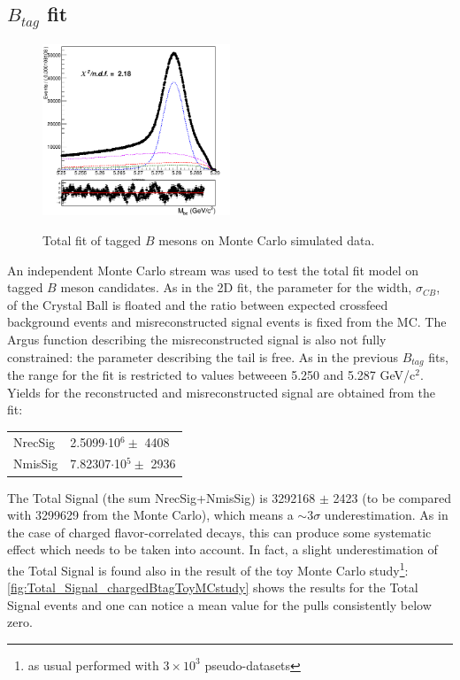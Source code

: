 \newpage
\subsection{ $B_{tag}$ fit}\label{sec:chargedAnticorrBtagFit}


\begin{figure}[h!]
\centering
{\includegraphics[width=0.50\textwidth]{06-chargedAnticorrBtoLambda/figs/stream1_chargedBtag_Total_fit_sigmaCB_misRecoSlope_free_370bins.png}}
\caption{Total fit of tagged $B$ mesons on Monte Carlo simulated data.}
\label{fig:chargedAnticorrLambdaC_BtagFit}
\end{figure}
\vspace{1.5cm} 

An independent Monte Carlo stream was used to test the total fit model on tagged $B$ meson candidates.
As in the 2D fit, the parameter for the width, $\sigma_{CB}$, of the Crystal Ball is floated and the ratio between expected crossfeed background events and  misreconstructed signal events is fixed from the MC. 
The Argus function describing the misreconstructed signal is also not fully constrained: the parameter describing the tail is free.
As in the previous $B_{tag}$ fits, the range for the fit is restricted to values betweeen 5.250 and 5.287 GeV/c$^2$.
Yields for the reconstructed and misreconstructed signal are obtained from the fit:\\
\vspace{0.25 cm}

\begin{tabular}{ |p{2.5cm}||p{4.2cm}|  }
 \hline
 NrecSig  & 2.5099$\cdot$10$^6 \pm$ 4408\\
 NmisSig &  7.82307$\cdot$10$^5 \pm$ 2936 \\
 \hline
\end{tabular}


\vspace{0.5 cm}
\noindent The Total Signal (the sum  NrecSig+NmisSig) is 3292168 $\pm$ 2423 (to be compared with 3299629 from the Monte Carlo), which means a $\sim 3\sigma$ underestimation. As in the case of charged flavor-correlated decays, this can produce some systematic effect which needs to be taken into account.
In fact, a slight underestimation of the Total Signal is found also in the result of the toy Monte Carlo study\footnote{as usual performed with  $3\times10^3$ pseudo-datasets}: \cref{fig:Total_Signal_chargedBtagToyMCstudy} shows the results for the Total Signal events and one can notice a mean value for the pulls consistently below zero.



